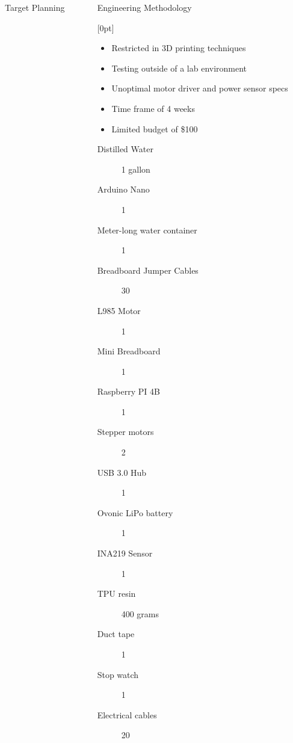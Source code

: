 \documentclass[final, 16pt]{beamer}
\newlength{\colwidth}
\newlength{\twocolwidth}
\begin{document}
\begin{frame}[t]
\begin{columns}[t]
\begin{column}{\colwidth}
\begin{block}{Target Planning}
  \end{block}

\end{column}

\separatorcolumn

\begin{column}{\twocolwidth}

  \begin{block}{Engineering Methodology}

    [0pt]

    \vspace{0.5cm}

    \begin{minipage}{0.24\linewidth}
      \begin{itemize}
        \item Restricted in 3D printing techniques
        \item Testing outside of a lab environment
        \item Unoptimal motor driver and power sensor specs
        \item Time frame of 4 weeks
        \item Limited budget of \$100
      \end{itemize}
    \end{minipage}\hfill%
    \begin{minipage}{0.72\linewidth}
      \begin{multicols}{3}
      \begin{description}
        \item[Distilled Water] 1 gallon
        \item[Arduino Nano] 1
        \item[Meter-long water container] 1
        \item[Breadboard Jumper Cables] 30
        \item[L985 Motor] 1 
        \item[Mini Breadboard] 1
        \item[Raspberry PI 4B] 1
        \item[Stepper motors] 2
        \item[USB 3.0 Hub] 1
        \item[Ovonic LiPo battery] 1 
        \item[INA219 Sensor] 1
        \item[TPU resin] 400 grams
        \item[Duct tape] 1
        \item[Stop watch] 1
        \item[Electrical cables] 20
      \end{description}
    \end{multicols}
    \end{minipage}


\end{block}
\end{column}
\end{columns}
\end{frame}
\end{document}
